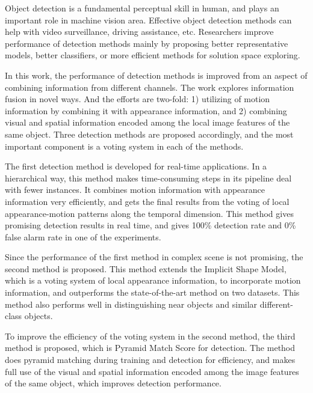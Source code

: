\begin{eabstract}


Object detection is a fundamental perceptual skill in human, and plays an important role in machine vision area. Effective object detection methods can help with video surveillance, driving assistance, etc. Researchers improve performance of detection methods mainly by proposing better representative models, better classifiers, or more efficient methods for  solution space exploring.

In this work, the performance of detection methods is improved from an aspect of combining information from different channels. The work explores information fusion in novel ways. And the efforts are two-fold: 1) utilizing of motion information by combining it with appearance information, and 2) combining visual and spatial information encoded among the local image features of the same object. Three detection methods are proposed accordingly, and the most important component is a voting system in each of the methods.

The first detection method is developed for real-time applications. In a hierarchical way, this method makes time-consuming steps in its pipeline deal with fewer instances. It
combines motion information with appearance information very efficiently, and gets the final results from the voting of local appearance-motion patterns along the temporal dimension.  This method gives promising detection results in real time, and gives 100\% detection rate and 0\% false alarm rate in one of the experiments.

Since the performance of the first method in complex scene is not promising, the second method is proposed. This method extends the Implicit Shape Model, which is a voting system of local appearance information, to incorporate motion information, and outperforms the state-of-the-art method on two datasets. This method also performs well in distinguishing near objects and similar different-class objects.


To improve the efficiency of the voting system in the second method, the third method is proposed, which is Pyramid Match Score for detection. The method does pyramid matching during training and detection for efficiency, and makes full use of the visual and spatial  information encoded among the image features of the same object, which improves detection performance.
\end{eabstract}




